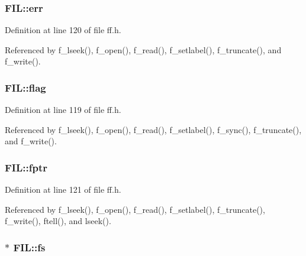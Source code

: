\subsubsection[{\texorpdfstring{err}{err}}]{ F\+I\+L\+::err}\hypertarget{structFIL_aea440945db26de9c4a88065c0c887fda}{}\label{structFIL_aea440945db26de9c4a88065c0c887fda}


Definition at line 120 of file ff.\+h.



Referenced by f\+\_\+lseek(), f\+\_\+open(), f\+\_\+read(), f\+\_\+setlabel(), f\+\_\+truncate(), and f\+\_\+write().

\subsubsection[{\texorpdfstring{flag}{flag}}]{ F\+I\+L\+::flag}\hypertarget{structFIL_ac409508881f5a16f2998ae675072b376}{}\label{structFIL_ac409508881f5a16f2998ae675072b376}


Definition at line 119 of file ff.\+h.



Referenced by f\+\_\+lseek(), f\+\_\+open(), f\+\_\+read(), f\+\_\+setlabel(), f\+\_\+sync(), f\+\_\+truncate(), and f\+\_\+write().

\subsubsection[{\texorpdfstring{fptr}{fptr}}]{ F\+I\+L\+::fptr}\hypertarget{structFIL_a75d29cf9257c827d117887b9f924c4a9}{}\label{structFIL_a75d29cf9257c827d117887b9f924c4a9}


Definition at line 121 of file ff.\+h.



Referenced by f\+\_\+lseek(), f\+\_\+open(), f\+\_\+read(), f\+\_\+setlabel(), f\+\_\+truncate(), f\+\_\+write(), ftell(), and lseek().

\subsubsection[{\texorpdfstring{fs}{fs}}]{$\ast$ F\+I\+L\+::fs}\hypertarget{structFIL_a42376a6797a06228911c8b836c1e9030}{}\label{structFIL_a42376a6797a06228911c8b836c1e9030}


